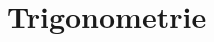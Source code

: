 \documentclass[8pt]{mpscheatsheet}
\begin{document}
    \section{Trigonometrie}
        
        
        
\end{document}
